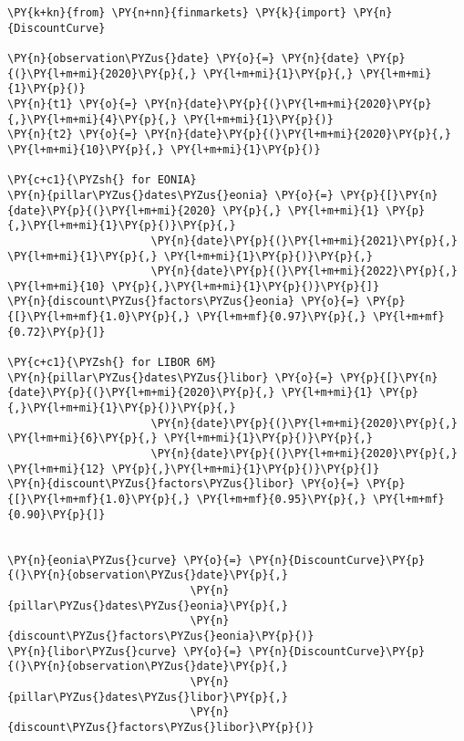 \begin{Answer}
\begin{tcolorbox}[breakable, size=fbox, boxrule=1pt, pad at break*=1mm,colback=cellbackground, colframe=cellborder]
\begin{Verbatim}[commandchars=\\\{\}]
\PY{k+kn}{from} \PY{n+nn}{finmarkets} \PY{k}{import} \PY{n}{DiscountCurve}

\PY{n}{observation\PYZus{}date} \PY{o}{=} \PY{n}{date} \PY{p}{(}\PY{l+m+mi}{2020}\PY{p}{,} \PY{l+m+mi}{1}\PY{p}{,} \PY{l+m+mi}{1}\PY{p}{)}
\PY{n}{t1} \PY{o}{=} \PY{n}{date}\PY{p}{(}\PY{l+m+mi}{2020}\PY{p}{,}\PY{l+m+mi}{4}\PY{p}{,} \PY{l+m+mi}{1}\PY{p}{)}
\PY{n}{t2} \PY{o}{=} \PY{n}{date}\PY{p}{(}\PY{l+m+mi}{2020}\PY{p}{,} \PY{l+m+mi}{10}\PY{p}{,} \PY{l+m+mi}{1}\PY{p}{)}

\PY{c+c1}{\PYZsh{} for EONIA}
\PY{n}{pillar\PYZus{}dates\PYZus{}eonia} \PY{o}{=} \PY{p}{[}\PY{n}{date}\PY{p}{(}\PY{l+m+mi}{2020} \PY{p}{,} \PY{l+m+mi}{1} \PY{p}{,}\PY{l+m+mi}{1}\PY{p}{)}\PY{p}{,} 
                      \PY{n}{date}\PY{p}{(}\PY{l+m+mi}{2021}\PY{p}{,} \PY{l+m+mi}{1}\PY{p}{,} \PY{l+m+mi}{1}\PY{p}{)}\PY{p}{,} 
                      \PY{n}{date}\PY{p}{(}\PY{l+m+mi}{2022}\PY{p}{,} \PY{l+m+mi}{10} \PY{p}{,}\PY{l+m+mi}{1}\PY{p}{)}\PY{p}{]}
\PY{n}{discount\PYZus{}factors\PYZus{}eonia} \PY{o}{=} \PY{p}{[}\PY{l+m+mf}{1.0}\PY{p}{,} \PY{l+m+mf}{0.97}\PY{p}{,} \PY{l+m+mf}{0.72}\PY{p}{]}

\PY{c+c1}{\PYZsh{} for LIBOR 6M}
\PY{n}{pillar\PYZus{}dates\PYZus{}libor} \PY{o}{=} \PY{p}{[}\PY{n}{date}\PY{p}{(}\PY{l+m+mi}{2020}\PY{p}{,} \PY{l+m+mi}{1} \PY{p}{,}\PY{l+m+mi}{1}\PY{p}{)}\PY{p}{,} 
                      \PY{n}{date}\PY{p}{(}\PY{l+m+mi}{2020}\PY{p}{,} \PY{l+m+mi}{6}\PY{p}{,} \PY{l+m+mi}{1}\PY{p}{)}\PY{p}{,} 
                      \PY{n}{date}\PY{p}{(}\PY{l+m+mi}{2020}\PY{p}{,} \PY{l+m+mi}{12} \PY{p}{,}\PY{l+m+mi}{1}\PY{p}{)}\PY{p}{]}
\PY{n}{discount\PYZus{}factors\PYZus{}libor} \PY{o}{=} \PY{p}{[}\PY{l+m+mf}{1.0}\PY{p}{,} \PY{l+m+mf}{0.95}\PY{p}{,} \PY{l+m+mf}{0.90}\PY{p}{]}


\PY{n}{eonia\PYZus{}curve} \PY{o}{=} \PY{n}{DiscountCurve}\PY{p}{(}\PY{n}{observation\PYZus{}date}\PY{p}{,} 
                            \PY{n}{pillar\PYZus{}dates\PYZus{}eonia}\PY{p}{,} 
                            \PY{n}{discount\PYZus{}factors\PYZus{}eonia}\PY{p}{)}
\PY{n}{libor\PYZus{}curve} \PY{o}{=} \PY{n}{DiscountCurve}\PY{p}{(}\PY{n}{observation\PYZus{}date}\PY{p}{,} 
                            \PY{n}{pillar\PYZus{}dates\PYZus{}libor}\PY{p}{,} 
                            \PY{n}{discount\PYZus{}factors\PYZus{}libor}\PY{p}{)}



\end{Verbatim}
\end{tcolorbox}
\end{Answer}
